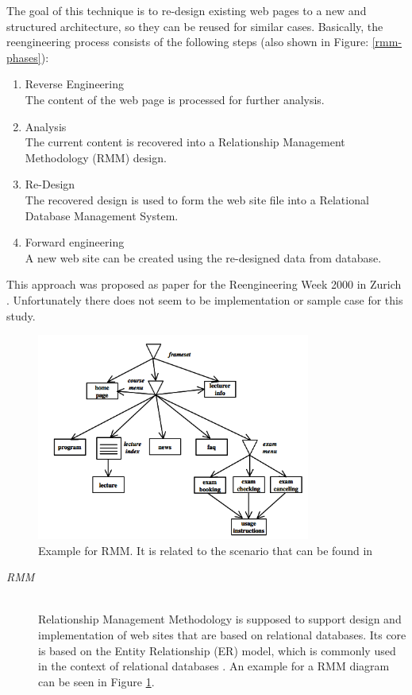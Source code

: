 \begin{enumerate}[A.]
	The goal of this technique is to re-design existing web pages to a new and structured architecture, so they can be reused for similar cases. Basically, the reengineering process consists of the following steps (also shown in Figure: \ref{rmm-phases}):
	
	\begin{enumerate}
		\item Reverse Engineering\\
			The content of the web page is processed for further analysis.
		\item Analysis\\ 
			The current content is recovered into a Relationship Management Methodology (RMM) design.
		\item Re-Design\\
			The recovered design is used to form the web site file into a Relational Database Management System.
		\item Forward engineering\\
			A new web site can be created using the re-designed data from database.
	\end{enumerate}
	
	This approach was proposed as paper for the Reengineering Week 2000 in Zurich \cite{antoniol2000web}. Unfortunately there does not seem to be implementation or sample case for this study. 

	\begin{figure}\centering
			\includegraphics[width=9cm]{images/rmm-example.png}
			\caption{Example for RMM. It is related to the scenario that can be found in \cite{antoniol2000web}}
			\label{rmm-example}
	\end{figure} 
	\begin{description}
	
		\item[\emph{RMM}]\mbox{}\\
		Relationship Management Methodology is supposed to support design and implementation of web sites that are based on relational databases. Its core is based on the Entity Relationship (ER) model, which is commonly used in the context of relational databases \cite{batini1992conceptual}. An example for a RMM diagram can be seen in Figure \ref{rmm-example}. 
		

\end{description}
\end{enumerate}
